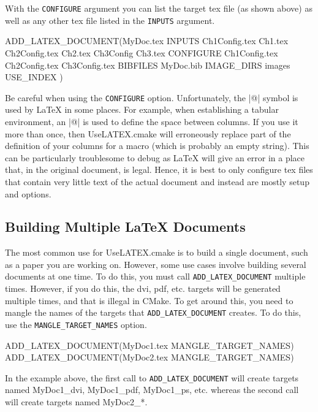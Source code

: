 \documentclass{article}
\newcommand*{\textfile}[1]{\textsf{#1}}
\newcommand*{\textcmake}[1]{\texttt{#1}}
\newcommand*{\textmaketarget}[1]{#1}
\newcommand*{\UseLATEX}{\textfile{UseLATEX.cmake}\xspace}
\newcommand*{\latex}{\LaTeX\xspace}
\newcommand*{\ald}{\textcmake{ADD\_LATEX\_DOCUMENT}\xspace}
\begin{document}
  With the \textcmake{CONFIGURE} argument you can list the target tex file
  (as shown above) as well as any other tex file listed in the
  \textcmake{INPUTS} argument.

  \begin{CodeListing}
ADD_LATEX_DOCUMENT(MyDoc.tex
  INPUTS Ch1Config.tex Ch1.tex Ch2Config.tex
         Ch2.tex Ch3Config Ch3.tex
  CONFIGURE Ch1Config.tex Ch2Config.tex Ch3Config.tex
  BIBFILES MyDoc.bib
  IMAGE_DIRS images
  USE_INDEX
  )
  \end{CodeListing}

  Be careful when using the \textcmake{CONFIGURE} option. Unfortunately,
  the \textlatex|@| symbol is used by \latex in some places. For example,
  when establishing a tabular environment, an \textlatex|@| is used to
  define the space between columns. If you use it more than once, then
  \UseLATEX will erroneously replace part of the definition of your columns
  for a macro (which is probably an empty string). This can be particularly
  troublesome to debug as \latex will give an error in a place that, in the
  original document, is legal. Hence, it is best to only configure tex
  files that contain very little text of the actual document and instead
  are mostly setup and options.

  \subsection{Building Multiple \latex Documents}
  \label{sec:BuldingMultipleLatexDocuments}

  The most common use for \UseLATEX is to build a single document, such as
  a paper you are working on. However, some use cases involve building
  several documents at one time. To do this, you must call \ald multiple
  times. However, if you do this, the dvi, pdf, etc. targets will be
  generated multiple times, and that is illegal in CMake.  To get around
  this, you need to mangle the names of the targets that \ald creates. To
  do this, use the \textcmake{MANGLE\_TARGET\_NAMES} option.

  \begin{CodeListing}
ADD_LATEX_DOCUMENT(MyDoc1.tex MANGLE_TARGET_NAMES)
ADD_LATEX_DOCUMENT(MyDoc2.tex MANGLE_TARGET_NAMES)
  \end{CodeListing}

  In the example above, the first call to \ald will create targets named
  \textmaketarget{MyDoc1\_dvi}, \textmaketarget{MyDoc1\_pdf},
  \textmaketarget{MyDoc1\_ps}, etc. whereas the second call will create
  targets named \textmaketarget{MyDoc2\_*}.
\end{document}
